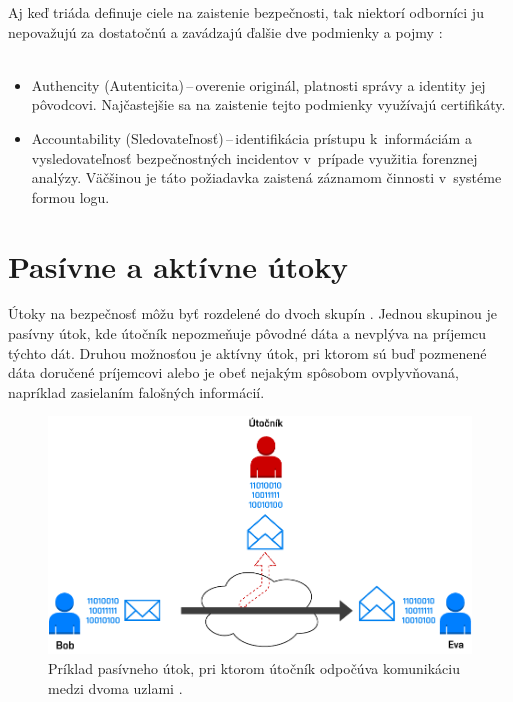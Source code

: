 	\noindent
	Aj keď triáda  definuje ciele na zaistenie bezpečnosti, tak niektorí odborníci ju nepovažujú za dostatočnú a zavádzajú ďalšie dve podmienky a pojmy  \cite{Stallings2011}:\\
	\\
	\begin{itemize}
		\item Authencity (Autenticita)\,--\,overenie originál, platnosti správy a identity jej pôvodcovi. Najčastejšie sa na zaistenie tejto podmienky využívajú certifikáty.
		\item Accountability (Sledovateľnosť)\,--\,identifikácia prístupu k~informáciám a vysledovateľnosť bezpečnostných incidentov v~prípade využitia forenznej analýzy. Väčšinou je táto požiadavka zaistená záznamom činnosti v~systéme formou logu.
	\end{itemize}





\newpage
\section{Pasívne a aktívne útoky}
Útoky na bezpečnosť môžu byť rozdelené do dvoch skupín \cite{Vyncke2008}. Jednou skupinou je pasívny útok, kde útočník nepozmeňuje pôvodné dáta a nevplýva na príjemcu týchto dát. Druhou možnosťou je aktívny útok, pri ktorom sú buď pozmenené dáta doručené príjemcovi alebo je obeť nejakým spôsobom ovplyvňovaná, napríklad zasielaním falošných informácií.

\begin{figure}[H]
	\begin{center}
		\includegraphics[scale=0.55]{obrazky/passive-attack.pdf}
	\end{center}
	\caption[Pasívny útok]{Príklad pasívneho útok, pri ktorom útočník odpočúva komunikáciu medzi dvoma uzlami \cite{Stallings2011}.}
	\label{passive-attack}
\end{figure}

